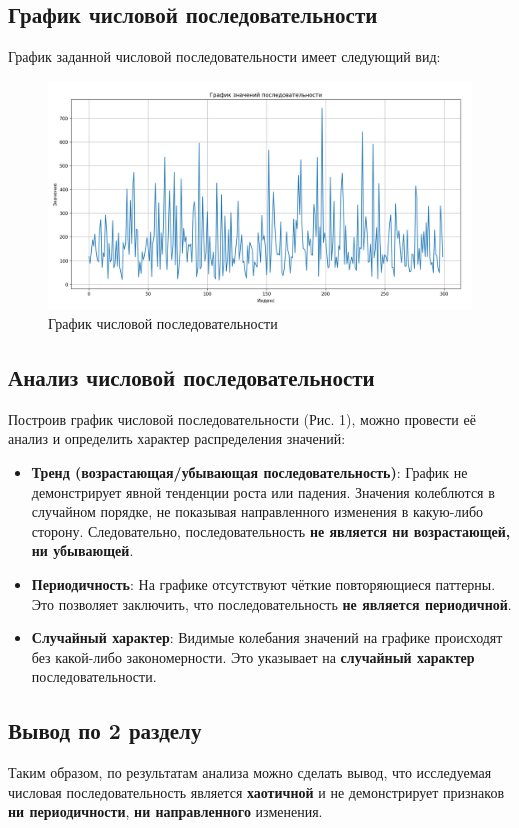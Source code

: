 \subsection{График числовой последовательности}
График заданной числовой последовательности имеет следующий вид:

\begin{figure}[H]
	\centering
	\includegraphics[width=1\textwidth]{../data/sequence.png}
	\caption{График числовой последовательности}
\end{figure}

\subsection{Анализ числовой последовательности}

Построив график числовой последовательности (Рис. 1), можно провести её анализ и определить характер распределения значений:

\begin{itemize}
	\item \textbf{Тренд (возрастающая/убывающая последовательность)}: График не демонстрирует явной тенденции роста или падения. Значения колеблются в случайном порядке, не показывая направленного изменения в какую-либо сторону. Следовательно, последовательность \textbf{не является ни возрастающей, ни убывающей}.

	\item \textbf{Периодичность}: На графике отсутствуют чёткие повторяющиеся паттерны. Это позволяет заключить, что последовательность \textbf{не является периодичной}.

	\item \textbf{Случайный характер}: Видимые колебания значений на графике происходят без какой-либо закономерности. Это указывает на \textbf{случайный характер} последовательности.
\end{itemize}

\subsection{Вывод по 2 разделу}

Таким образом, по результатам анализа можно сделать вывод, что исследуемая числовая последовательность является \textbf{хаотичной} и не демонстрирует признаков \textbf{ни периодичности}, \textbf{ни направленного} изменения.
